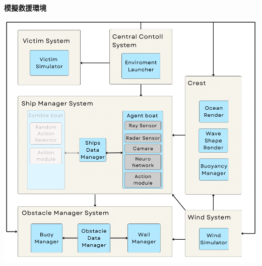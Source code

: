 \documentclass[12pt,a4paper]{ctexart}
\begin{document}
\textbf{模擬救援環境}
\begin{center}
\includegraphics[scale=0.5]{image/SimulationArchitecture.png}
\end{center}
\end{document}
